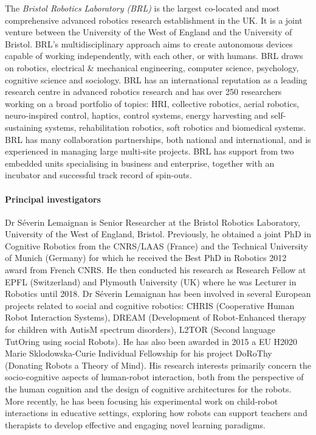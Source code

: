 \documentclass[]{article}
\let\oldparagraph\paragraph
\renewcommand{\paragraph}[1]{\oldparagraph{#1}\mbox{}}
\begin{document}
The \emph{Bristol Robotics Laboratory (BRL)} is the largest co-located
and most comprehensive advanced robotics research establishment in the
UK. It is a joint venture between the University of the West of England
and the University of Bristol. BRL's multidisciplinary approach aims to
create autonomous devices capable of working independently, with each
other, or with humans. BRL draws on robotics, electrical \& mechanical
engineering, computer science, psychology, cognitive science and
sociology. BRL has an international reputation as a leading research
centre in advanced robotics research and has over 250 researchers
working on a broad portfolio of topics: HRI, collective robotics, aerial
robotics, neuro-inspired control, haptics, control systems, energy
harvesting and self-sustaining systems, rehabilitation robotics, soft
robotics and biomedical systems. BRL has many collaboration
partnerships, both national and international, and is experienced in
managing large multi-site projects. BRL has support from two embedded
units specialising in business and enterprise, together with an
incubator and successful track record of spin-outs.

\hypertarget{principal-investigators}{%
\paragraph{Principal investigators}\label{principal-investigators}}

Dr Séverin Lemaignan is Senior Researcher at the Bristol Robotics
Laboratory, University of the West of England, Bristol. Previously, he
obtained a joint PhD in Cognitive Robotics from the CNRS/LAAS (France)
and the Technical University of Munich (Germany) for which he received
the Best PhD in Robotics 2012 award from French CNRS. He then conducted
his research as Research Fellow at EPFL (Switzerland) and Plymouth
University (UK) where he was Lecturer in Robotics until 2018. Dr Séverin
Lemaignan has been involved in several European projects related to
social and cognitive robotics: CHRIS (Cooperative Human Robot
Interaction Systems), DREAM (Development of Robot-Enhanced therapy for
children with AutisM spectrum disorders), L2TOR (Second language
TutOring using social Robots). He has also been awarded in 2015 a EU
H2020 Marie Sklodowska-Curie Individual Fellowship for his project
DoRoThy (Donating Robots a Theory of Mind). His research interests
primarily concern the socio-cognitive aspects of human-robot
interaction, both from the perspective of the human cognition and the
design of cognitive architectures for the robots. More recently, he has
been focusing his experimental work on child-robot interactions in
educative settings, exploring how robots can support teachers and
therapists to develop effective and engaging novel learning paradigms.
\end{document}
